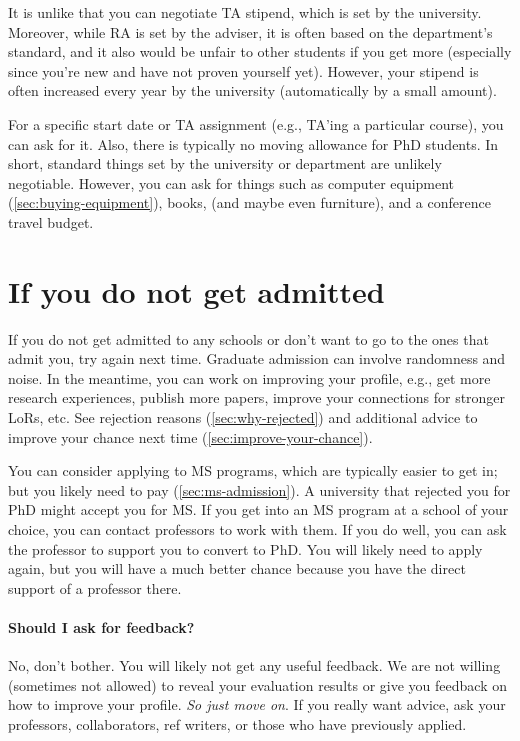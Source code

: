 \documentclass[oneside,11pt,dvipsnames]{book}
\begin{document}
It is unlike that you can negotiate TA stipend, which is set by the university. Moreover, while RA is set by the adviser, it is often based on the department's standard, and it also would be unfair to other students if you get more (especially since you're new and have not proven yourself yet). However, your stipend is often increased every year by the university (automatically by a small amount).

For a specific start date or TA assignment (e.g., TA'ing a particular course), you can ask for it. Also, there is typically no moving allowance for PhD students. In short, standard things set by the university or department are unlikely negotiable.  However, you can ask for things such as computer equipment (\autoref{sec:buying-equipment}), books, (and maybe even furniture), and a conference travel budget.



\section{If you do not get admitted}\label{sec:not-accepted} 

If you do not get admitted to any schools or don't want to go to the ones that admit you, try again next time.  Graduate admission can involve randomness and noise. In the meantime, you can work on improving your profile, e.g., get more research experiences, publish more papers, improve your connections for stronger LoRs, etc. See rejection reasons (\autoref{sec:why-rejected}) and additional advice to improve your chance next time (\autoref{sec:improve-your-chance}).

You can consider applying to MS programs, which are typically easier to get in; but you likely need to pay (\autoref{sec:ms-admission}).  A university that rejected you for PhD might accept you for MS.
If you get into an MS program at a school of your choice, you can contact professors to work with them. If you do well, you can ask the professor to support you to convert to PhD. You will likely need to apply again, but you will have a much better chance because you have the direct support of a professor there.

\paragraph{Should I ask for feedback?}
No, don't bother.  You will likely not get any useful feedback.  We are not willing (sometimes not allowed) to reveal your evaluation results or give you feedback on how to improve your profile. \emph{So just move on}.  If you really want advice, ask your professors, collaborators, ref writers, or those who have previously applied.
\end{document}
